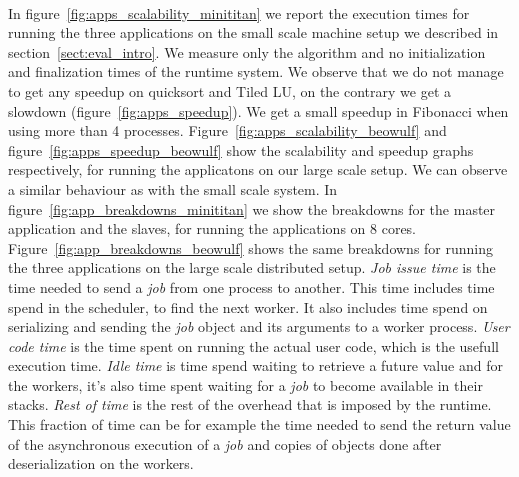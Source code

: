 \paragraph{}
	In figure~\ref{fig:apps_scalability_minititan} we report the execution times for running the three applications on the
small scale machine setup we described in section~\ref{sect:eval_intro}.  We measure only the algorithm and no initialization
and finalization times of the runtime system.
We observe that we do not manage to get any speedup 
on quicksort and Tiled LU, on the contrary we get a slowdown (figure~\ref{fig:apps_speedup}).
We get a small speedup in Fibonacci when using more than 4 processes.  
Figure~\ref{fig:apps_scalability_beowulf} and figure~\ref{fig:apps_speedup_beowulf} show the 
scalability and speedup graphs respectively, for running the applicatons on our large scale setup.
We can observe a similar behaviour as with the small scale system.
In figure~\ref{fig:app_breakdowns_minititan} 
we show the breakdowns for the master application and the slaves, for running the applications on 8 cores.
Figure~\ref{fig:app_breakdowns_beowulf} shows the same breakdowns for running the three applications
on the large scale distributed setup.
\emph{Job issue time} is the time needed to send a \emph{job} from one process to another. This time includes
time spend in the scheduler, to find the next worker.  It also includes time spend on serializing and sending 
the \emph{job} object and its arguments to a worker process.  \emph{User code time} is the time spent on 
running the actual user code, which is the usefull execution time.  
\emph{Idle time} is time spend waiting to retrieve a future 
value and for the workers, it's also time spent waiting for a \emph{job} to become available in their stacks.
\emph{Rest of time} is the rest of the overhead that is imposed by the runtime.  This fraction of time can be for 
example the time needed to send the return value of the asynchronous execution of a \emph{job} and copies
of objects done after deserialization on the workers.
